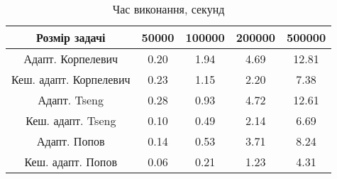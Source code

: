 \begin{table}[H]
	\centering
	\begin{tabular}{|c||c|c|c|c|}\hline
		Розмір задачі & 50000 & 100000 & 200000 & 500000 \\ \hline \hline
		Адапт. Корпелевич & 0.20 & 1.94 & 4.69 & 12.81 \\ \hline
		Кеш. адапт. Корпелевич & 0.23 & 1.15 & 2.20 & 7.38 \\ \hline
		Адапт. Tseng & 0.28 & 0.93 & 4.72 & 12.61 \\ \hline
		Кеш. адапт. Tseng & 0.10 & 0.49 & 2.14 & 6.69 \\ \hline
		Адапт. Попов & 0.14 & 0.53 & 3.71 & 8.24 \\ \hline
		Кеш. адапт. Попов & 0.06 & 0.21 & 1.23 & 4.31 \\ \hline
	\end{tabular}
	\caption{Час виконання, секунд}
\end{table}
